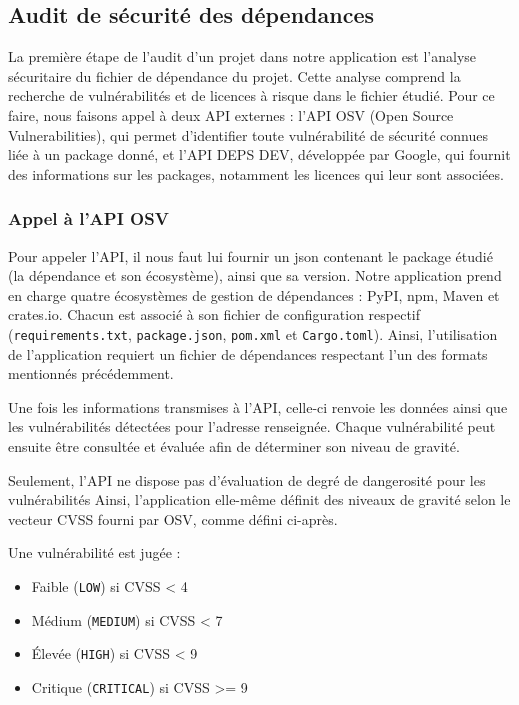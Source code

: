 \documentclass[a4paper,12pt]{article}
\providecommand{\tightlist}{\setlength{\itemsep}{0pt}\setlength{\parskip}{0pt}}
\providecommand{\tightlist}{}
\begin{document}
\subsection{Audit de sécurité des
dépendances}\label{audit-de-suxe9curituxe9-des-duxe9pendances}

La première étape de l'audit d'un projet dans notre application est
l'analyse sécuritaire du fichier de dépendance du projet. Cette analyse
comprend la recherche de vulnérabilités et de licences à risque dans le
fichier étudié. Pour ce faire, nous faisons appel à deux API externes :
l'API OSV (Open Source Vulnerabilities), qui permet d'identifier toute
vulnérabilité de sécurité connues liée à un package donné, et l'API DEPS
DEV, développée par Google, qui fournit des informations sur les
packages, notamment les licences qui leur sont associées.

\subsubsection{Appel à l'API OSV}\label{appel-uxe0-lapi-osv}

Pour appeler l'API, il nous faut lui fournir un json contenant le
package étudié (la dépendance et son écosystème), ainsi que sa version.
Notre application prend en charge quatre écosystèmes de gestion de
dépendances : PyPI, npm, Maven et crates.io. Chacun est associé à son
fichier de configuration respectif
(\texttt{requirements.\allowbreak{}txt},
\texttt{package.\allowbreak{}json}, \texttt{pom.xml} et
\texttt{Cargo.\allowbreak{}toml}). Ainsi, l'utilisation de l'application
requiert un fichier de dépendances respectant l'un des formats
mentionnés précédemment.

Une fois les informations transmises à l'API, celle-ci renvoie les
données ainsi que les vulnérabilités détectées pour l'adresse
renseignée. Chaque vulnérabilité peut ensuite être consultée et évaluée
afin de déterminer son niveau de gravité.

Seulement, l'API ne dispose pas d'évaluation de degré de dangerosité
pour les vulnérabilités Ainsi, l'application elle-même définit des
niveaux de gravité selon le vecteur CVSS fourni par OSV, comme défini
ci-après.

Une vulnérabilité est jugée :

\begin{itemize}
\tightlist
\item
  Faible (\texttt{LOW}) si CVSS \textless{} 4
\item
  Médium (\texttt{MEDIUM}) si CVSS \textless{} 7
\item
  Élevée (\texttt{HIGH}) si CVSS \textless{} 9
\item
  Critique (\texttt{CRITICAL}) si CVSS \textgreater= 9
\end{itemize}
\end{document}
